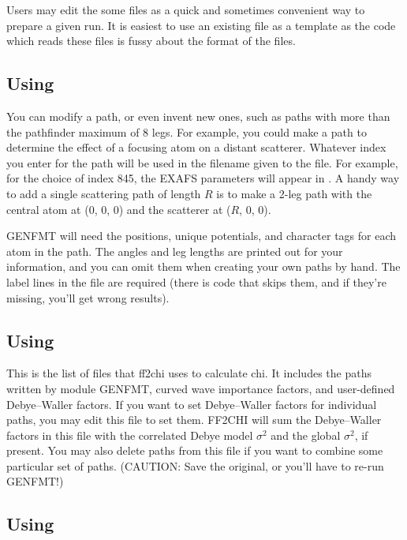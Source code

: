 \documentclass[11pt,oneside]{report} %
\begin{document}
Users may edit the some files as a quick and sometimes convenient way
to prepare a given run.  It is easiest to use an existing file as a
template as the code which reads these files is fussy about the format
of the files.



\subsection{Using }
\label{sec:paths.dat}

You can modify a path, or even invent new ones, such as paths
with more than the pathfinder maximum of 8 legs.  For example, you
could make a path to determine the effect of a focusing atom on a
distant scatterer.  Whatever index you enter for the path will be used
in the filename given to the  file.  For example,
for the choice of index 845, the EXAFS parameters will appear in
.
A handy way to add a single scattering path of length $R$ is to make a
2-leg path with the central atom at (0, 0, 0) and the scatterer at
($R$, 0, 0).

GENFMT will need the positions, unique potentials, and character tags
for each atom in the path.  The angles and leg lengths are printed out
for your information, and you can omit them when creating your own
paths by hand.  The label lines in the file are required (there is code
that skips them, and if they're missing, you'll get wrong results).






\subsection{Using }
\label{sec:list.dat}

This is the list of files that ff2chi uses to calculate chi.  It
includes the paths written by module GENFMT, curved wave importance
factors, and user-defined Debye--Waller factors.  If you want to set
Debye--Waller factors for individual paths, you may edit this file to
set them.  FF2CHI will sum the Debye--Waller factors in this file with
the correlated Debye model $\sigma^2$ and the global $\sigma^2$, if
present.  You may also delete paths from this file if you want to
combine some particular set of paths.  (CAUTION: Save the original, or
you'll have to re-run GENFMT!)



\subsection{Using }
\label{sec:geom.dat}
\end{document}
